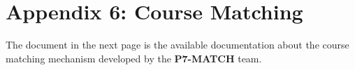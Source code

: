 \chapter{Appendix 6: Course Matching}
The document in the next page is the available documentation about the course
matching mechanism developed by the \textbf{P7-MATCH} team.

